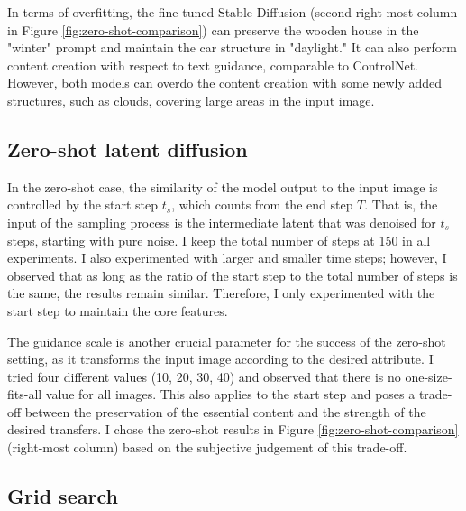 In terms of overfitting, the fine-tuned Stable Diffusion (second right-most column in Figure \ref{fig:zero-shot-comparison}) can preserve the wooden house in the "winter" prompt and maintain the car structure in "daylight." It can also perform content creation with respect to text guidance, comparable to ControlNet. However, both models can overdo the content creation with some newly added structures, such as clouds, covering large areas in the input image.

\subsection{Zero-shot latent diffusion}
In the zero-shot case, the similarity of the model output to the input image is controlled by the start step  $t_s$, which counts from the end step  $T$. That is, the input of the sampling process is the intermediate latent that was denoised for $t_s$ steps, starting with pure noise. I keep the total number of steps at 150 in all experiments. I also experimented with larger and smaller time steps; however, I observed that as long as the ratio of the start step to the total number of steps is the same, the results remain similar. Therefore, I only experimented with the start step to maintain the core features.


The guidance scale is another crucial parameter for the success of the zero-shot setting, as it transforms the input image according to the desired attribute. I tried four different values (10, 20, 30, 40) and observed that there is no one-size-fits-all value for all images. This also applies to the start step and poses a trade-off between the preservation of the essential content and the strength of the desired transfers. I chose the zero-shot results in Figure \ref{fig:zero-shot-comparison}  (right-most column) based on the subjective judgement of this trade-off.

\subsection{Grid search}

